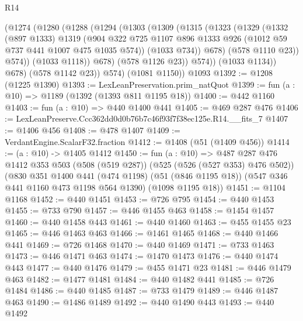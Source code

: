 \begin{lexlean}{R14}
\begin{coremodule}
              (@1274
                (@1280
                  (@1288
                    (@1294
                      (@1303
                        (@1309
                          (@1315
                            (@1323
                              (@1329
                                (@1332
                                  (@897 @1333)
                                  @1319
                                  (@904
                                    @322
                                    @725
                                    @1107
                                    @896
                                    @1333
                                    @926
                                    (@1012 @59 @737 @441 @1007 @475 @1035 @574))
                                  (@1033 @734))
                                @678)
                              (@578 @1110 @23))
                            @574))
                        (@1033 @1118))
                      @678)
                    (@578 @1126 @23))
                  @574))
              (@1033 @1134))
            @678)
          (@578 @1142 @23))
        @574)
      (@1081 @1150))
    @1093
@1392 := @1208 (@1225 @1390)
@1393 := LexLeanPreservation.prim_natQuot
@1399 := fun (a : @10) => @1189 (@1392 (@1393 @811 @1195 @18))
@1400 := @442 @1160
@1403 := fun (a : @10) => @440 @1400 @441
@1405 := @469 @287 @476
@1406 := LexLeanPreserve.Ccc362dd0d0b76b7c46f93f7f38ec125e.R14.__fits_7
@1407 := @1406 @456
@1408 := @478 @1407
@1409 := VerdantEngine.ScalarF32.fraction
@1412 := @1408 (@51 (@1409 @456))
@1414 := (a : @10) -> @1405 @1412
@1450 := fun (a : @10) =>
  @487
    @287
    @476
    @1412
    @353
    @503
    (@508 (@519 @287))
    (@525 (@526 (@527 @353) @476 @502))
    (@830
      @351
      @1400
      @441
      (@474 @1198)
      (@51 (@846 @1195 @18))
      (@547 @346 @441 @1160 @473 @1198 @564 @1390)
      (@1098 @1195 @18))
@1451 := @1104 @1168
@1452 := @440 @1451
@1453 := @726 @795
@1454 := @440 @1453
@1455 := @733 @790
@1457 := @446 @1455 @463
@1458 := @1454 @1457
@1460 := @440 @1458 @443
@1461 := @440 @1460
@1463 := @455 @1455 @23
@1465 := @446 @1463 @463
@1466 := @1461 @1465
@1468 := @440 @1466 @441
@1469 := @726 @1468
@1470 := @440 @1469
@1471 := @733 @1463
@1473 := @446 @1471 @463
@1474 := @1470 @1473
@1476 := @440 @1474 @443
@1477 := @440 @1476
@1479 := @455 @1471 @23
@1481 := @446 @1479 @463
@1482 := @1477 @1481
@1484 := @440 @1482 @441
@1485 := @726 @1484
@1486 := @440 @1485
@1487 := @733 @1479
@1489 := @446 @1487 @463
@1490 := @1486 @1489
@1492 := @440 @1490 @443
@1493 := @440 @1492

\end{coremodule}
\end{lexlean}
